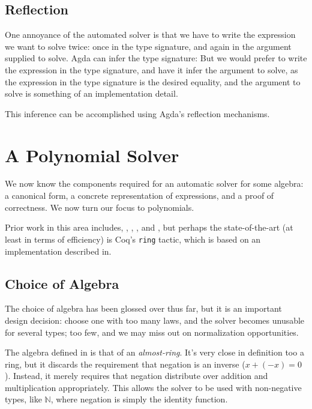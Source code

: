 \documentclass[draft, twocolumn]{article}
\theoremstyle{definition}
\begin{document}
\subsection{Reflection}
One annoyance of the automated solver is that we have to write the expression we
want to solve twice: once in the type signature, and again in the argument
supplied to solve. Agda can infer the type signature:
But we would prefer to write the expression in the type signature, and have it
infer the argument to solve, as the expression in the type signature is the
desired equality, and the argument to solve is something of an implementation
detail.

 This inference can be accomplished using
Agda's reflection mechanisms.
\section{A Polynomial Solver}
We now know the components required for an automatic solver for some algebra: a
canonical form, a concrete representation of expressions, and a proof of
correctness. We now turn our focus to polynomials.

Prior work in this area includes\cite{geuvers_automatically_2017},
\cite{meshveliani_dependent_2013}, \cite{zalakain_evidence-providing_2017},
\cite{cheng_functional_2018}, and \cite{russino_polynomial_2017}, but perhaps
the state-of-the-art (at least in terms of efficiency) is Coq's \texttt{ring}
tactic\cite{the_coq_development_team_2018_1219885}, which is based on an
implementation described in\cite{hutchison_proving_2005}.
\subsection{Choice of Algebra}
The choice of algebra has been glossed over thus far, but it is an important
design decision: choose one with too many laws, and the solver becomes unusable
for several types; too few, and we may miss out on normalization opportunities.

The algebra defined in \cite{hutchison_proving_2005} is that of an
\emph{almost-ring}. It's very close in definition too a ring, but it discards
the requirement that negation is an inverse (\(x + (-x) = 0\)). Instead, it
merely requires that negation distribute over addition and multiplication
appropriately. This allows the solver to be used with non-negative types, like
\(\mathbb{N}\), where negation is simply the identity function.
\end{document}
